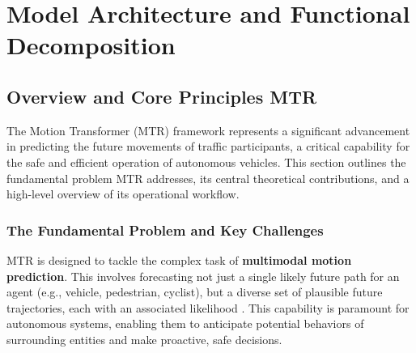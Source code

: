 \chapter{Model Architecture and Functional Decomposition}
\label{ch:model_architecture}

\section{Overview and Core Principles MTR}
\label{sec:overview}

The Motion Transformer (MTR) framework represents a significant advancement in predicting the future movements of traffic participants, a critical capability for the safe and efficient operation of autonomous vehicles. This section outlines the fundamental problem MTR addresses, its central theoretical contributions, and a high-level overview of its operational workflow.

\subsection{The Fundamental Problem and Key Challenges}
\label{subsec:problem_challenges}

MTR is designed to tackle the complex task of \textbf{multimodal motion prediction}. This involves forecasting not just a single likely future path for an agent (e.g., vehicle, pedestrian, cyclist), but a diverse set of plausible future trajectories, each with an associated likelihood \cite{Shi2022MTR, Shi2022MTR_A}. This capability is paramount for autonomous systems, enabling them to anticipate potential behaviors of surrounding entities and make proactive, safe decisions.

